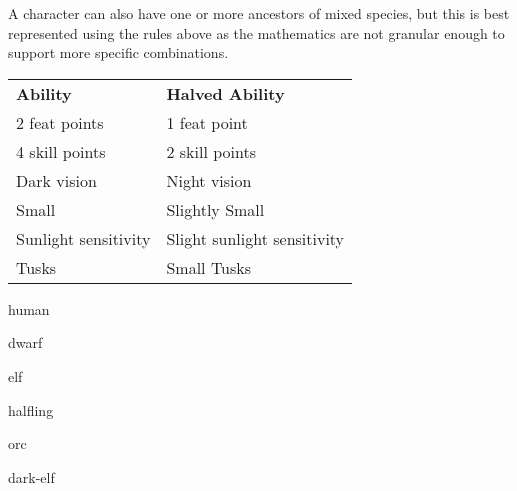 \begin{multicols*}{2}
    A character can also have one or more ancestors of mixed species, but this is
    best represented using the rules above as the mathematics are not granular
    enough to support more specific combinations.
    \begin{center}
        \unclassedrowcolors
        \begin{tabularx}{0.5\textwidth}{l X}
            \textbf{Ability} & \textbf{Halved Ability} \\
            2 feat points & 1 feat point \\
            4 skill points & 2 skill points \\
            Dark vision & Night vision \\
            Small & Slightly Small \\
            Sunlight sensitivity & Slight sunlight sensitivity \\
            Tusks & Small Tusks \\
        \end{tabularx}
        \label{tab:inherited-abilities}
    \end{center}

    {human}

    {dwarf}

    {elf}

    {halfling}

    {orc}

    {dark-elf}
\end{multicols*}


